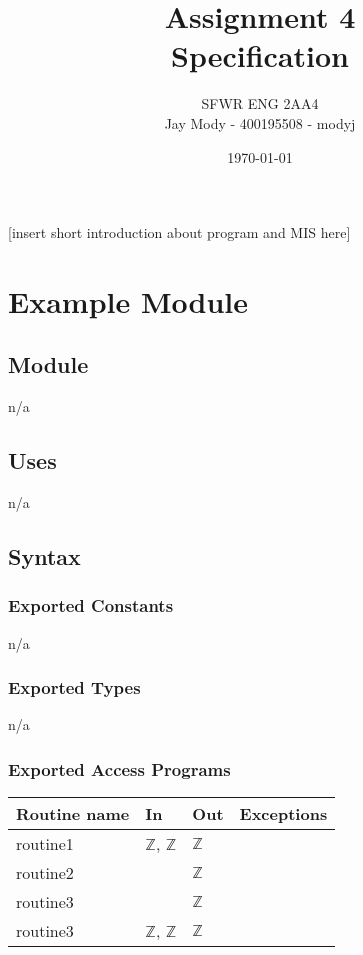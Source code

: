 \documentclass[12pt]{article}
\title{Assignment 4\\Specification}
\author{SFWR ENG 2AA4\\Jay Mody - 400195508 - modyj}
\date{\today}
\begin{document}
\maketitle



[insert short introduction about program and MIS here]



\newpage
\section* {Example Module}
\subsection*{Module}
n/a


\subsection* {Uses}
n/a


\subsection* {Syntax}
\subsubsection* {Exported Constants}
n/a

\subsubsection* {Exported Types}
n/a

\subsubsection* {Exported Access Programs}
\begin{tabular}{| l | l | l | l |}
\hline
\textbf{Routine name} & \textbf{In} & \textbf{Out} & \textbf{Exceptions}\\
\hline
routine1 & $\mathbb{Z}$, $\mathbb{Z}$ & $\mathbb{Z}$ & \\
\hline
routine2 & ~ & $\mathbb{Z}$ & ~\\
\hline
routine3 & ~ & $\mathbb{Z}$ & ~\\
\hline
routine3 & $\mathbb{Z}$, $\mathbb{Z}$ & $\mathbb{Z}$ & ~\\
\hline
\end{tabular}
\end{document}
